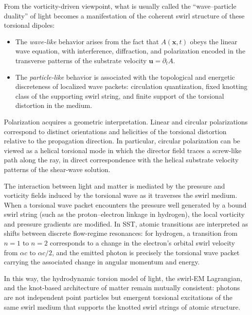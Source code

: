 \documentclass[10pt,reprint,aps,onecolumn,nofootinbib]{revtex4-2}
\begin{document}
        From the vorticity-driven viewpoint, what is usually called the ``wave--particle duality'' of light becomes a manifestation of the coherent swirl structure of these torsional dipoles:

        \begin{itemize}
            \item The \emph{wave-like} behavior arises from the fact that \(A(\mathbf{x},t)\) obeys the linear wave equation, with interference, diffraction, and polarization encoded in the transverse patterns of the substrate velocity \(\mathbf{u} = \partial_t A\).\cite{Jackson1999}
            \item The \emph{particle-like} behavior is associated with the topological and energetic discreteness of localized wave packets: circulation quantization, fixed knotting class of the supporting swirl string, and finite support of the torsional distortion in the medium.\cite{Helmholtz1858,Thomson1867}
        \end{itemize}

        Polarization acquires a geometric interpretation. Linear and circular polarizations correspond to distinct orientations and helicities of the torsional distortion relative to the propagation direction. In particular, circular polarization can be viewed as a helical torsional mode in which the director field traces a screw-like path along the ray, in direct correspondence with the helical substrate velocity patterns of the shear-wave solution.\cite{IskandaraniPhoton2025}

        The interaction between light and matter is mediated by the pressure and vorticity fields induced by the torsional wave as it traverses the swirl medium. When a torsional wave packet encounters the pressure well generated by a bound swirl string (such as the proton--electron linkage in hydrogen), the local vorticity and pressure gradients are modified. In SST, atomic transitions are interpreted as shifts between discrete flow-regime resonances: for hydrogen, a transition from \(n=1\) to \(n=2\) corresponds to a change in the electron's orbital swirl velocity from \(\alpha c\) to \(\alpha c/2\), and the emitted photon is precisely the torsional wave packet carrying the associated change in angular momentum and energy.\cite{IskandaraniHydrogenGS}

        In this way, the hydrodynamic torsion model of light, the swirl-EM Lagrangian, and the knot-based architecture of matter remain mutually consistent: photons are not independent point particles but emergent torsional excitations of the same swirl medium that supports the knotted swirl strings of atomic structure.
\end{document}
